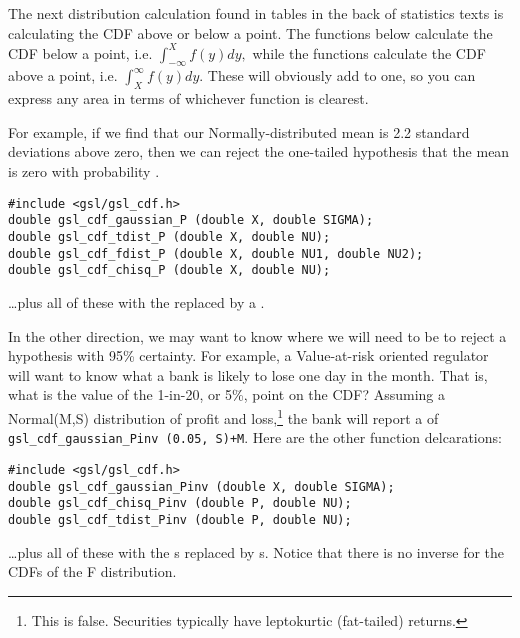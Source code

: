The next distribution calculation found in tables in the back of
statistics texts is calculating the CDF above or below a point. 
The functions below calculate the CDF below a point, i.e.
$\int_{-\infty}^X f(y) dy,$
while the functions calculate the CDF above a point, i.e.
$\int^{\infty}_X f(y) dy.$
These will obviously add to one, so you can express any area in terms of whichever function is clearest.

For example, if we find that our Normally-distributed mean is 2.2 standard
deviations above zero, then we can reject the one-tailed hypothesis that
the mean is zero with probability .

\begin{lstlisting}
#include <gsl/gsl_cdf.h>
double gsl_cdf_gaussian_P (double X, double SIGMA);
double gsl_cdf_tdist_P (double X, double NU);
double gsl_cdf_fdist_P (double X, double NU1, double NU2);
double gsl_cdf_chisq_P (double X, double NU);
\end{lstlisting}
\dots plus all of these with the  replaced by a .


In the other direction, we may want to know where we will need to be to reject a hypothesis with 95\%
certainty. For example, a Value-at-risk oriented regulator will want to know what a bank is likely to lose 
one day in the month. That is, what is the value of the 1-in-20, or 5\%, point on the CDF?
Assuming a Normal(M,S) distribution of profit and loss,\footnote{This is false. Securities
typically have leptokurtic (fat-tailed) returns.} the bank will report a  of {\tt
gsl\_cdf\_gaussian\_Pinv (0.05, S)+M}. Here are the other function delcarations:
\begin{lstlisting}
#include <gsl/gsl_cdf.h>
double gsl_cdf_gaussian_Pinv (double X, double SIGMA);
double gsl_cdf_chisq_Pinv (double P, double NU);
double gsl_cdf_tdist_Pinv (double P, double NU);
\end{lstlisting}
\dots plus all of these with the s replaced by s.
Notice that there is no inverse for the CDFs of the F distribution.





